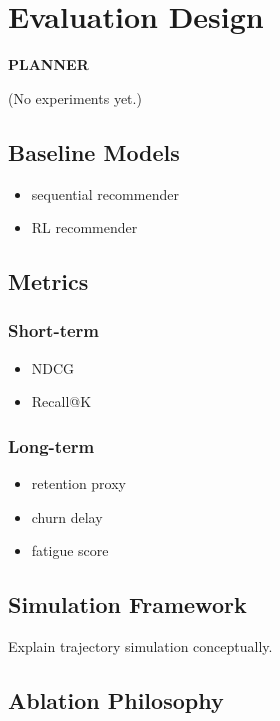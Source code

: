 \documentclass[lettersize,journal]{IEEEtran}
\begin{document}
% 

\section{Evaluation Design}

\textbf{PLANNER}

(No experiments yet.)

\subsection{Baseline Models}

\begin{itemize}
    \item sequential recommender
    \item RL recommender
\end{itemize}

\subsection{Metrics}

\subsubsection{Short-term}

\begin{itemize}
    \item NDCG
    \item Recall@K
\end{itemize}

\subsubsection{Long-term}

\begin{itemize}
    \item retention proxy
    \item churn delay
    \item fatigue score
\end{itemize}

\subsection{Simulation Framework}

Explain trajectory simulation conceptually.

\subsection{Ablation Philosophy}
\end{document}
